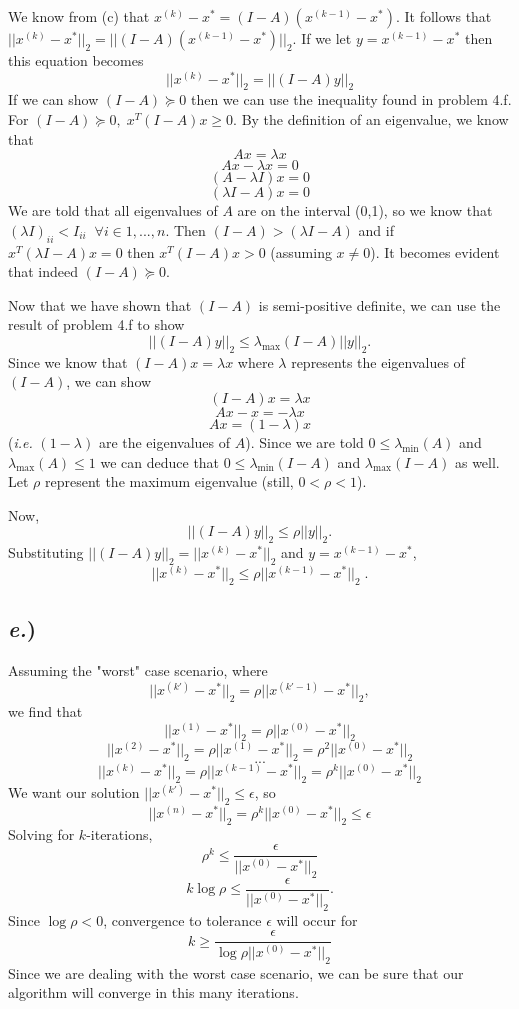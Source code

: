 \documentclass{report}
\begin{document}
We know from  (c) that $x^{(k)} - x^* = (I-A)(x^{(k-1)} - x^*)$. It follows that $||x^{(k)} - x^*||_2 = ||(I-A)(x^{(k-1)} - x^*)||_2$. If we let $y = x^{(k-1)} - x^*$ then this equation becomes
$$ ||x^{(k)} - x^*||_2 = ||(I-A)y||_2 $$
If we can show $(I-A) \succeq 0$ then we can use the inequality found in problem 4.f. For $(I-A) \succeq 0, \; x^T(I-A)x \geq 0$. By the definition of an eigenvalue, we know that
$$ Ax = \lambda x $$
$$ Ax-\lambda x = 0 $$
$$ (A-\lambda I)x = 0 $$
$$ (\lambda I - A)x = 0 $$
We are told that all eigenvalues of $A$ are on the interval (0,1), so we know that $(\lambda I)_{ii} < I_{ii} \;\; \forall i \in {1,...,n}$. Then $(I-A) > (\lambda I -A)$ and if $x^T(\lambda I-A)x = 0$ then $x^T(I-A)x > 0$ (assuming $x \neq 0$). It becomes evident that indeed $(I-A) \succeq 0$.

Now that we have shown that $(I-A)$ is semi-positive definite, we can use the result of problem 4.f to show
$$||(I-A)y||_2 \leq \lambda_{\text{max}}(I-A)||y||_2 .$$
Since we know that $(I-A)x = \lambda x$ where $\lambda$ represents the eigenvalues of $(I-A)$, we can show
$$ (I-A)x = \lambda x $$
$$ Ax - x = -\lambda x $$
$$ Ax = (1-\lambda)x $$
(\textit{i.e.} $(1-\lambda)$ are the eigenvalues of $A$). Since we are told $0 \leq \lambda_{\text{min}}(A)$ and $\lambda_{\text{max}}(A) \leq 1$ we can deduce that $0 \leq \lambda_{\text{min}}(I-A)$ and $\lambda_{\text{max}}(I-A)$ as well. Let $\rho$ represent the maximum eigenvalue (still, $0<\rho<1$).

Now, 
$$||(I-A)y||_2 \leq \rho||y||_2 .$$
Substituting $||(I-A)y||_2 = ||x^{(k)} - x^*||_2$ and $y = x^{(k-1)} - x^*$,
$$\boxed{ ||x^{(k)} - x^*||_2 \leq \rho||x^{(k-1)} - x^*||_2 }\; .$$

\subsection*{\textit{e.})}

Assuming the "worst" case scenario, where 
$$ ||x^{(k')} - x^*||_2 = \rho||x^{(k'-1)} - x^*||_2 , $$
we find that 
$$ ||x^{(1)} - x^*||_2 = \rho||x^{(0)} - x^*||_2 $$
$$ ||x^{(2)} - x^*||_2 = \rho||x^{(1)} - x^*||_2 = \rho^2||x^{(0)} - x^*||_2 $$
$$...$$
$$ ||x^{(k)} - x^*||_2 = \rho||x^{(k-1)} - x^*||_2  = \rho^k||x^{(0)} - x^*||_2 $$
We want our solution $||x^{(k')}-x^*||_2 \leq \epsilon$, so
$$ ||x^{(n)} - x^*||_2 = \rho^k||x^{(0)} - x^*||_2 \leq \epsilon $$
Solving for $k$-iterations,
$$ \rho^k \leq \frac{\epsilon}{||x^{(0)} - x^*||_2} $$
$$ k \log\rho \leq \frac{\epsilon}{||x^{(0)} - x^*||_2} .$$
Since $\log\rho < 0$, convergence to tolerance $\epsilon$ will occur for
$$ k \geq \frac{\epsilon}{\log\rho||x^{(0)} - x^*||_2} $$
Since we are dealing with the worst case scenario, we can be sure that our algorithm will converge in this many iterations.
\end{document}

